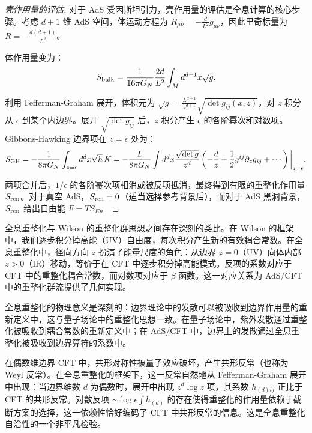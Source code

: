 \begin{proof}[壳作用量的评估]
对于 AdS 爱因斯坦引力，壳作用量的评估是全息计算的核心步骤。考虑 $d+1$ 维 AdS 空间，体运动方程为 $R_{\mu\nu} = -\frac{d}{L^2} g_{\mu\nu}$，因此里奇标量为 $R = -\frac{d(d+1)}{L^2}$。

体作用量变为：
\begin{equation}
    S_{\rm bulk} = \frac{1}{16\pi G_N} \frac{2d}{L^2} \int_M d^{d+1}x \sqrt{g}.
\end{equation}

利用 Fefferman-Graham 展开，体积元为 $\sqrt{g} = \frac{L^{d+1}}{z^{d+1}} \sqrt{\det g_{ij}(x,z)}$，对 $z$ 积分从 $\epsilon$ 到某个内边界。展开 $\sqrt{\det g_{ij}}$ 后，$z$ 积分产生 $\epsilon$ 的各阶幂次和对数项。Gibbons-Hawking 边界项在 $z=\epsilon$ 处为：
\begin{equation}
    S_{\rm GH} = -\frac{1}{8\pi G_N} \int_{z=\epsilon} d^d x \sqrt{h} \, K = -\frac{L}{8\pi G_N} \int d^d x \frac{\sqrt{\det g}}{z^d} \left( -\frac{d}{z} + \frac{1}{2} g^{ij} \partial_z g_{ij} + \cdots \right)\bigg|_{z=\epsilon}.
\end{equation}

两项合并后，$1/\epsilon$ 的各阶幂次项相消或被反项抵消，最终得到有限的重整化作用量 $S_{\rm ren}$。对于真空 AdS，$S_{\rm ren} = 0$（适当选择参考背景后），而对于 AdS 黑洞背景，$S_{\rm ren}$ 给出自由能 $F = T S_E$。
\end{proof}

\begin{remark}
全息重整化与 Wilson 的重整化群思想之间存在深刻的类比\cite{Skenderis2002}。在 Wilson 的框架中，我们逐步积分掉高能（UV）自由度，每次积分产生新的有效耦合常数。在全息重整化中，径向方向 $z$ 扮演了能量尺度的角色：从边界 $z=0$（UV）向体内部 $z>0$（IR）移动，等价于在 CFT 中逐步积分掉高能模式。反项的系数对应于 CFT 中的重整化耦合常数，而对数项对应于 $\beta$ 函数。这一对应关系为 AdS/CFT 中的重整化群流\cite{deHaro2000}提供了几何实现。
\end{remark}

\begin{note}[全息重整化的物理意义]
全息重整化的物理意义是深刻的：边界理论中的发散可以被吸收到边界作用量的重新定义中，这与量子场论中的重整化思想一致。在量子场论中，紫外发散通过重整化被吸收到耦合常数的重新定义中；在 AdS/CFT 中，边界上的发散通过全息重整化被吸收到边界算符的系数中。
\end{note}

\begin{remark}[共形反常与全息重整化]
在偶数维边界 CFT 中，共形对称性被量子效应破坏，产生共形反常（也称为 Weyl 反常）。在全息重整化的框架下，这一反常自然地从 Fefferman-Graham 展开\cite{deHaro2000}中出现：当边界维数 $d$ 为偶数时，展开中出现 $z^d \log z$ 项，其系数 $h_{(d)ij}$ 正比于 CFT 的共形反常。对数反项 $\sim \log\epsilon \int h_{(d)}$ 的存在使得重整化的作用量依赖于截断方案的选择，这一依赖性恰好编码了 CFT 中共形反常的信息\cite{Henningson1998}。这是全息重整化自洽性的一个非平凡检验。
\end{remark}

